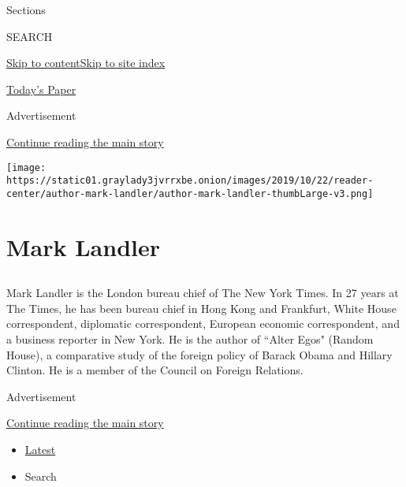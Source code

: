 Sections

SEARCH

\protect\hyperlink{site-content}{Skip to
content}\protect\hyperlink{site-index}{Skip to site index}

\href{https://myaccount.nytimes3xbfgragh.onion/auth/login?response_type=cookie\&client_id=vi}{}

\href{https://www.nytimes3xbfgragh.onion/section/todayspaper}{Today's
Paper}

Advertisement

\protect\hyperlink{after-top}{Continue reading the main story}

\texttt{[image: https://static01.graylady3jvrrxbe.onion/images/2019/10/22/reader-center/author-mark-landler/author-mark-landler-thumbLarge-v3.png]}

\hypertarget{mark-landler}{%
\section{Mark Landler}\label{mark-landler}}

\subsection{}

Mark Landler is the London bureau chief of The New York Times. In 27
years at The Times, he has been bureau chief in Hong Kong and Frankfurt,
White House correspondent, diplomatic correspondent, European economic
correspondent, and a business reporter in New York. He is the author of
``Alter Egos" (Random House), a comparative study of the foreign policy
of Barack Obama and Hillary Clinton. He is a member of the Council on
Foreign Relations.

Advertisement

\protect\hyperlink{after-mid1}{Continue reading the main story}

\begin{itemize}
\tightlist
\item
  \protect\hyperlink{stream-panel}{Latest}
\item
  Search
\end{itemize}

